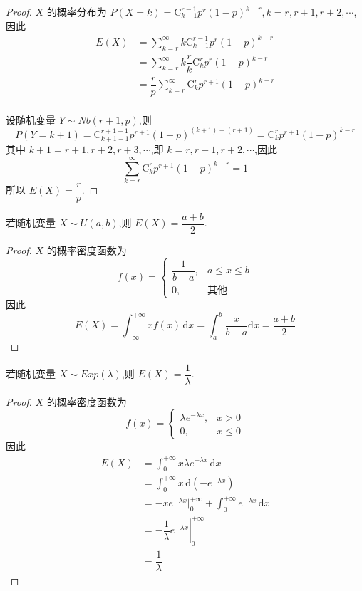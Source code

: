 \begin{proof}
    $X$ 的概率分布为 $P(X=k) = \mathrm{C}_{k-1}^{r-1} p^r (1-p)^{k-r}, k = r, r+1, r+2, \cdots$,因此
    $$
    \begin{aligned}
        E(X) &= \sum_{k=r}^{\infty} k \mathrm{C}_{k-1}^{r-1} p^r (1-p)^{k-r} \\
        &= \sum_{k=r}^{\infty} k \dfrac{r}{k} \mathrm{C}_{k}^{r} p^r (1-p)^{k-r} \\
        &= \dfrac{r}{p} \sum_{k=r}^{\infty} \mathrm{C}_{k}^{r} p^{r+1} (1-p)^{k-r} \\
    \end{aligned}
    $$

    设随机变量 $Y \sim Nb(r+1, p)$,则
    $$
    P(Y=k+1) = \mathrm{C}_{k+1-1}^{r+1-1} p^{r+1} (1-p)^{(k+1)-(r+1)} = \mathrm{C}_{k}^{r} p^{r+1} (1-p)^{k-r}
    $$
    其中 $k+1 = r+1, r+2, r+3, \cdots$,即 $k = r, r+1, r+2, \cdots$,因此
    $$
    \sum_{k=r}^{\infty} \mathrm{C}_{k}^{r} p^{r+1} (1-p)^{k-r} = 1
    $$
    所以 $E(X) = \dfrac{r}{p}$.
\end{proof}

\begin{conclusion}
    \indent 若随机变量 $X \sim U(a,b)$,则 $E(X) = \dfrac{a+b}{2}$.
\end{conclusion}

\begin{proof}
    $X$ 的概率密度函数为
    $$
    f(x) = \begin{cases}
        \dfrac{1}{b-a}, & a \leqslant x \leqslant b \\[0.5em]
        0, & \text{其他}
    \end{cases}
    $$
    因此
    $$
    E(X) = \int_{-\infty}^{+\infty} x f(x) \, \text{d}x = \int_a^b \dfrac{x}{b-a} \text{d}x = \dfrac{a+b}{2}
    $$
\end{proof}

\begin{conclusion}
    \indent 若随机变量 $X \sim Exp(\lambda)$,则 $E(X) = \dfrac{1}{\lambda}$.
\end{conclusion}

\begin{proof}
    $X$ 的概率密度函数为
    $$
    f(x) = \begin{cases}
        \lambda e^{-\lambda x}, & x>0 \\
        0, & x \leqslant 0
    \end{cases}
    $$
    因此
    $$
    \begin{aligned}
        E(X) &= \int_0^{+\infty} x \lambda e^{-\lambda x} \, \text{d}x \\
        &= \int_0^{+\infty} x \, \text{d} (-e^{-\lambda x}) \\
        &= -xe^{-\lambda x} \Big|_0^{+\infty} + \int_0^{+\infty} e^{-\lambda x} \, \text{d}x \\
        &= \left. -\dfrac{1}{\lambda} e^{-\lambda x} \right|_0^{+\infty} \\
        &= \dfrac{1}{\lambda}
    \end{aligned}
    $$
\end{proof}

